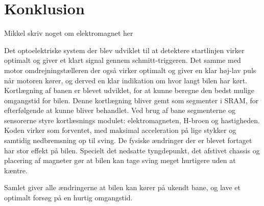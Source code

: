 

\section{Konklusion}


Mikkel skriv noget om elektromagnet her


Det optoelektriske system der blev udviklet til at detektere startlinjen virker optimalt og giver et klart signal gennem schmitt-triggeren. Det samme med motor omdrejningstælleren der også virker optimalt og giver en klar høj-lav puls når motoren kører, og derved en klar indikation om hvor langt bilen har kørt.
Kortlægning af banen er blevet udviklet, for at kunne beregne den bedst mulige omgangstid for bilen.
Denne kortlægning bliver gemt som segmenter i SRAM, for efterfølgende at kunne bliver behandlet.
Ved brug af bane segmenterne og sensorerne styre kortlæsnings modulet: elektromagneten, H-broen og hastigheden. Koden virker som forventet, med maksimal acceleration på lige stykker og samtidig nedbremsning op til sving.
De fysiske ændringer der er blevet fortaget har stor effekt på bilen. Specielt det nedsatte tyngdepunkt, det afstivet chassis og placering af magneter gør at bilen kan tage sving meget hurtigere uden at kæntre.

Samlet giver alle ændringerne at bilen kan kører på ukendt bane, og lave et optimalt forsøg på en hurtig omgangstid.
